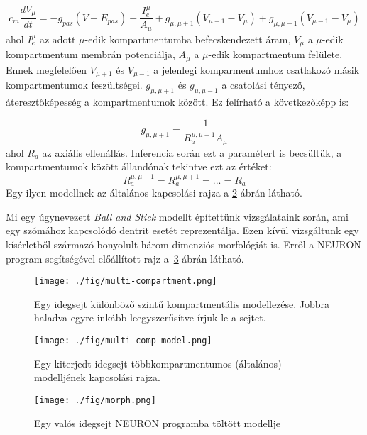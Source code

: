 \begin{equation}\label{eq:multi_comp}
	c_m\dfrac{dV_\mu}{dt} = -g_{pas}\left(V - E_{pas}\right) + \dfrac{I_e^\mu}{A_\mu} + g_{\mu,\mu+1}\left(V_{\mu+1}-V_\mu \right) + g_{\mu,\mu-1}\left(V_{\mu-1}-V_\mu \right)
\end{equation}
ahol $I_e^\mu$ az adott $\mu$-edik kompartmentumba befecskendezett áram, $V_\mu$ a $\mu$-edik kompartmentum membrán potenciálja, $A_\mu$ a $\mu$-edik kompartmentum felülete. Ennek megfelelően $V_{\mu+1}$ és $V_{\mu-1}$ a jelenlegi komparmentumhoz csatlakozó másik kompartmentumok feszültségei. $g_{\mu,\mu+1}$ és $g_{\mu,\mu-1}$ a csatolási tényező, áteresztőképesség a kompartmentumok között. Ez felírható a következőképp is:

\begin{equation}\label{eq:Ra}
	g_{\mu,\mu+1} = \dfrac{1}{R_a^{\mu,\mu+1} A_\mu}
\end{equation}
ahol $R_a$ az axiális ellenállás. Inferencia során ezt a paramétert is becsültük, a kompartmentumok között állandónak tekintve ezt az értéket: 
\[ R_a^{\mu,\mu-1} = R_a^{\mu,\mu+1} = ... = R_a \]
Egy ilyen modellnek az általános kapcsolási rajza a \ref{fig:multi_comp_model} ábrán látható. 

Mi egy úgynevezett \textit{Ball and Stick} modellt építettünk vizsgálataink során, ami egy szómához kapcsolódó dentrit esetét reprezentálja. Ezen kívül vizsgáltunk egy kísérletből származó bonyolult három dimenziós morfológiát is. Erről a NEURON program segítségével előállított rajz a~\ref{fig:morph} ábrán látható.


\begin{figure}[!htb]
	\centering
	\texttt{[image: ./fig/multi-compartment.png]}
	\caption[Többkompartmentumos modellezés]{\cite{dayan2001theoretical} Egy idegsejt különböző szintű kompartmentális modellezése. Jobbra haladva egyre inkább leegyszerűsítve írjuk le a sejtet.}
	\label{fig:multi_comp}
\end{figure}

\begin{figure}[!htb]
	\centering
	\texttt{[image: ./fig/multi-comp-model.png]}
	\caption[Többkompartmentumos modell]{\cite{dayan2001theoretical} Egy kiterjedt idegsejt többkompartmentumos (általános) modelljének kapcsolási rajza.}
	\label{fig:multi_comp_model}
\end{figure}

\begin{figure}[!htb]
	\centering
	\texttt{[image: ./fig/morph.png]}
	\caption[Kísérletből származó morfológia]{Egy valós idegsejt NEURON programba töltött modellje}
	\label{fig:morph}
\end{figure}





